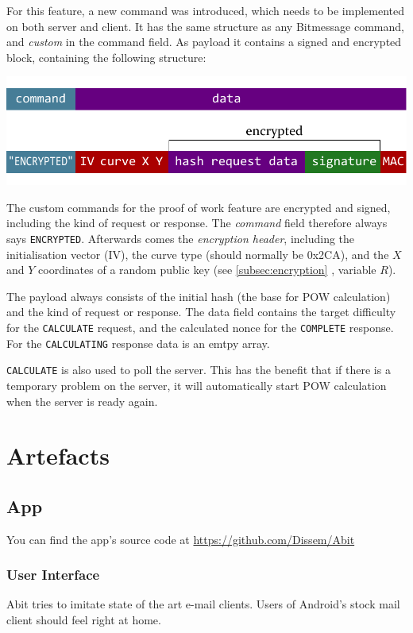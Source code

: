\documentclass{bfh}
\begin{document}
  For this feature, a new command was introduced, which needs to be implemented on both server and client. It has the same structure as any Bitmessage command, and \textit{custom} in the command field. As payload it contains a signed and encrypted block, containing the following structure:

  \includegraphics[width=\textwidth]{images/custom_message.pdf}

  The custom commands for the proof of work feature are encrypted and signed, including the kind of request or response. The \textit{command} field therefore always says \texttt{ENCRYPTED}. Afterwards comes the \textit{encryption header}, including the initialisation vector (IV), the curve type (should normally be 0x2CA), and the $X$ and $Y$ coordinates of a random public key (see \ref{subsec:encryption} , variable $R$).

  The payload always consists of the initial hash (the base for \ac{POW} calculation) and the kind of request or response. The data field contains the target difficulty for the \texttt{CALCULATE} request, and the calculated nonce for the \texttt{COMPLETE} response. For the \texttt{CALCULATING} response data is an emtpy array.

  \texttt{CALCULATE} is also used to poll the server. This has the benefit that if there is a temporary problem on the server, it will automatically start \ac{POW} calculation when the server is ready again.


  \newpage
  \section{Artefacts}

  \subsection{App}
  You can find the app's source code at \url{https://github.com/Dissem/Abit}

  \subsubsection{User Interface}
  Abit tries to imitate state of the art e-mail clients. Users of Android's stock mail client should feel right at home.
\end{document}
